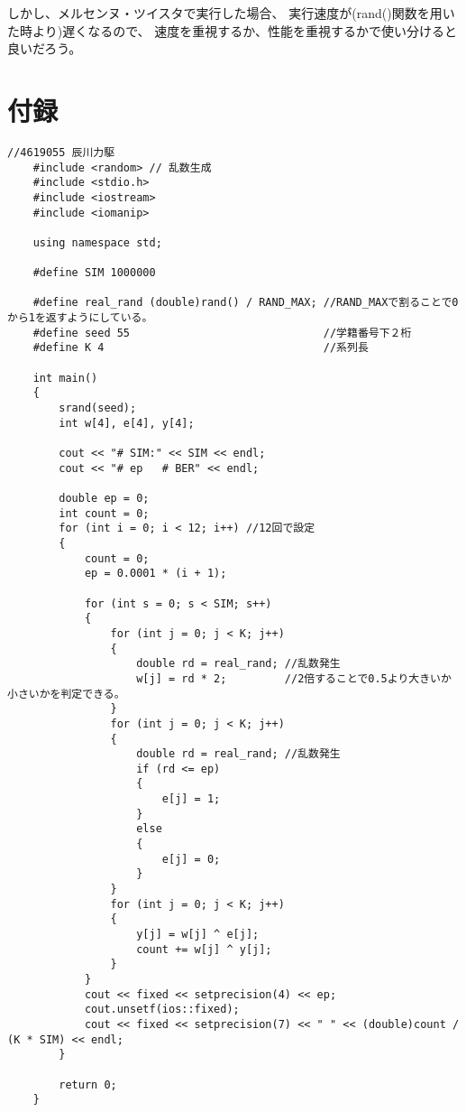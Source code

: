\documentclass[12pt]{jarticle}
\begin{document}
しかし、メルセンヌ・ツイスタで実行した場合、
実行速度が(rand()関数を用いた時より)遅くなるので、
速度を重視するか、性能を重視するかで使い分けると良いだろう。

\clearpage
\appendix
\section{付録}
\begin{lstlisting}[style = lstcpp,caption=kadai3\_rand.cpp]
    //4619055 辰川力駆
    #include <random> // 乱数生成
    #include <stdio.h>
    #include <iostream>
    #include <iomanip>
    
    using namespace std;
    
    #define SIM 1000000
    
    #define real_rand (double)rand() / RAND_MAX; //RAND_MAXで割ることで0から1を返すようにしている。
    #define seed 55                              //学籍番号下２桁
    #define K 4                                  //系列長
    
    int main()
    {
        srand(seed);
        int w[4], e[4], y[4];
    
        cout << "# SIM:" << SIM << endl;
        cout << "# ep   # BER" << endl;
    
        double ep = 0;
        int count = 0;
        for (int i = 0; i < 12; i++) //12回で設定
        {
            count = 0;
            ep = 0.0001 * (i + 1);
    
            for (int s = 0; s < SIM; s++)
            {
                for (int j = 0; j < K; j++)
                {
                    double rd = real_rand; //乱数発生
                    w[j] = rd * 2;         //2倍することで0.5より大きいか小さいかを判定できる。
                }
                for (int j = 0; j < K; j++)
                {
                    double rd = real_rand; //乱数発生
                    if (rd <= ep)
                    {
                        e[j] = 1;
                    }
                    else
                    {
                        e[j] = 0;
                    }
                }
                for (int j = 0; j < K; j++)
                {
                    y[j] = w[j] ^ e[j];
                    count += w[j] ^ y[j];
                }
            }
            cout << fixed << setprecision(4) << ep;
            cout.unsetf(ios::fixed);
            cout << fixed << setprecision(7) << " " << (double)count / (K * SIM) << endl;
        }
    
        return 0;
    }
\end{lstlisting}

\end{document}
